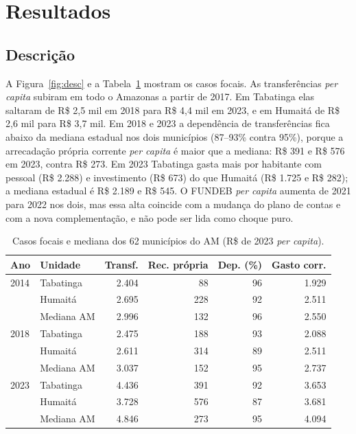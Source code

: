 \documentclass[10pt,twocolumn]{article}
\begin{document}
\section{Resultados}\label{sec:res}

\subsection{Descrição}
A Figura~\ref{fig:desc} e a Tabela~\ref{tab:desc} mostram os casos focais. As transferências \textit{per capita} subiram em todo o Amazonas a partir de 2017. Em Tabatinga elas saltaram de R\$ 2,5 mil em 2018 para R\$ 4,4 mil em 2023, e em Humaitá de R\$ 2,6 mil para R\$ 3,7 mil. Em 2018 e 2023 a dependência de transferências fica abaixo da mediana estadual nos dois municípios (87--93\% contra 95\%), porque a arrecadação própria corrente \textit{per capita} é maior que a mediana: R\$ 391 e R\$ 576 em 2023, contra R\$ 273. Em 2023 Tabatinga gasta mais por habitante com pessoal (R\$ 2.288) e investimento (R\$ 673) do que Humaitá (R\$ 1.725 e R\$ 282); a mediana estadual é R\$ 2.189 e R\$ 545. O FUNDEB \textit{per capita} aumenta de 2021 para 2022 nos dois, mas essa alta coincide com a mudança do plano de contas e com a nova complementação, e não pode ser lida como choque puro.

\begin{table}[t]
\centering\footnotesize
\caption{Casos focais e mediana dos 62 municípios do AM (R\$ de 2023 \textit{per capita}).}\label{tab:desc}
\setlength{\tabcolsep}{3.5pt}
\begin{tabular}{llrrrr}
\toprule
Ano & Unidade & Transf. & Rec. própria & Dep. (\%) & Gasto corr.\\
\midrule
2014 & Tabatinga & 2.404 & 88 & 96 & 1.929\\
 & Humaitá & 2.695 & 228 & 92 & 2.511\\
 & Mediana AM & 2.996 & 132 & 96 & 2.550\\
2018 & Tabatinga & 2.475 & 188 & 93 & 2.088\\
 & Humaitá & 2.611 & 314 & 89 & 2.511\\
 & Mediana AM & 3.037 & 152 & 95 & 2.737\\
2023 & Tabatinga & 4.436 & 391 & 92 & 3.653\\
 & Humaitá & 3.728 & 576 & 87 & 3.681\\
 & Mediana AM & 4.846 & 273 & 95 & 4.094\\
\bottomrule
\end{tabular}

\vspace{2pt}{\scriptsize Nota: ``Dep.'' é transferências totais sobre receita total, sem receitas intraorçamentárias. Fonte: Finbra/Siconfi, IBGE, IPCA; cálculo do autor.}
\end{table}
\end{document}
